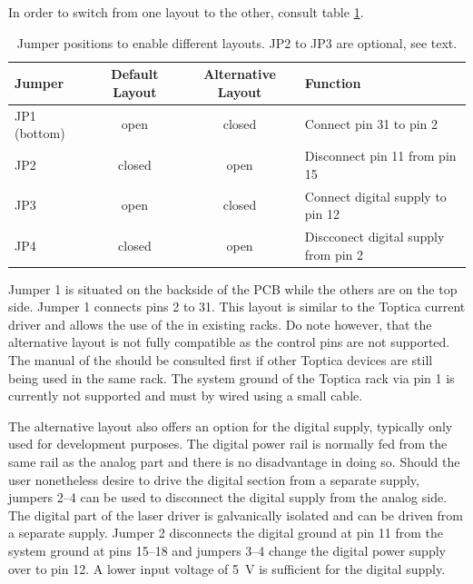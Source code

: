 In order to switch from one layout to the other, consult table \ref{tab:jumper_power_supply_layout}.
\begin{table}[hb]
    \centering
    \begin{tabular}{lccl}
        \toprule
        Jumper& Default Layout& Alternative Layout & Function\\
        \midrule
        JP1 (bottom)& open& closed& Connect pin \num{31} to pin \num{2}\\
        JP2& closed& open\footnotemark& Disconnect pin \num{11} from pin \num{15}\\
        JP3& open& closed\addtocounter{footnote}{-1}\addtocounter{Hfootnote}{-1}\footnotemark& Connect digital supply to pin \num{12}\\
        JP4& closed& open\addtocounter{footnote}{-1}\addtocounter{Hfootnote}{-1}\footnotemark& Discconect digital supply from pin \num{2}\\
        \bottomrule
    \end{tabular}
    \caption{Jumper positions to enable different layouts. JP2 to JP3 are optional, see text.}
    \label{tab:jumper_power_supply_layout}
\end{table}

Jumper \num{1} is situated on the backside of the PCB while the others are on the top side. Jumper \num{1} connects pins \num{2} to \num{31}. This layout is similar to the Toptica  current driver and allows the use of the  in existing racks. Do note however, that the alternative layout is not fully compatible as the control pins are not supported. The manual of the  should be consulted first if other Toptica devices are still being used in the same rack. The system ground of the Toptica rack via pin \num{1} is currently not supported and must by wired using a small cable.

The alternative layout also offers an option for the digital supply, typically only used for development purposes. The digital power rail is normally fed from the same rail as the analog part and there is no disadvantage in doing so. Should the user nonetheless desire to drive the digital section from a separate supply, jumpers \numrange{2}{4} can be used to disconnect the digital supply from the analog side. The digital part of the laser driver is galvanically isolated and can be driven from a separate supply. Jumper \num{2} disconnects the digital ground at pin \num{11} from the system ground at pins \numrange{15}{18} and jumpers \numrange{3}{4} change the digital power supply over to pin \num{12}. A lower input voltage of \qty{5}{\V} is sufficient for the digital supply.

